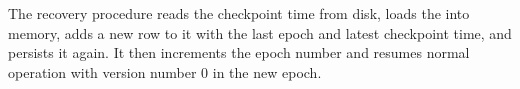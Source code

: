 The recovery procedure reads the checkpoint time from disk, loads the  into memory, adds a new row to it with the last epoch and latest checkpoint time, and persists it again. It then increments the epoch number and resumes normal operation with version number $0$ in the new epoch.







